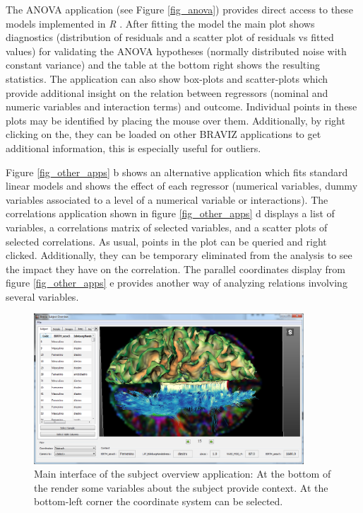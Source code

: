 \documentclass[twocolumn]{svjour3}
\begin{document}
The ANOVA application (see Figure \ref{fig_anova}) provides direct access to these models implemented in \emph{R} \cite{team_r:_2012}. After fitting the model the main plot shows diagnostics (distribution of residuals and a scatter plot of residuals vs fitted values) for validating the ANOVA hypotheses (normally distributed noise with constant variance) and the table at the bottom right shows the resulting statistics. The application can also show box-plots and scatter-plots which provide additional insight on the relation between regressors (nominal and numeric variables and interaction terms) and outcome. Individual points in these plots may be identified by placing the mouse over them. Additionally, by right clicking on the, they can be loaded on other BRAVIZ applications to get additional information, this is especially useful for outliers.

Figure \ref{fig_other_apps} b shows an alternative application which fits standard linear models and shows the effect of each regressor (numerical variables, dummy variables associated to a level of a numerical variable or interactions). The correlations application shown in figure \ref{fig_other_apps} d displays a list of variables, a correlations matrix of selected variables, and a scatter plots of selected correlations. As usual, points in the plot can be queried and right clicked. Additionally, they can be temporary eliminated from the analysis to see the impact they have on the correlation. The parallel coordinates display from figure \ref{fig_other_apps} e provides another way of analyzing relations involving several variables.

\begin{figure}
\begin{center}
\includegraphics[width=0.9\textwidth]{figures/subj_overview_full.PNG}
\end{center}
 \caption{\label{fig_subject}Main interface of the subject overview application: At the bottom of the render some variables about the subject provide context. At the bottom-left corner the coordinate system can be selected. }
\end{figure}
\end{document}
